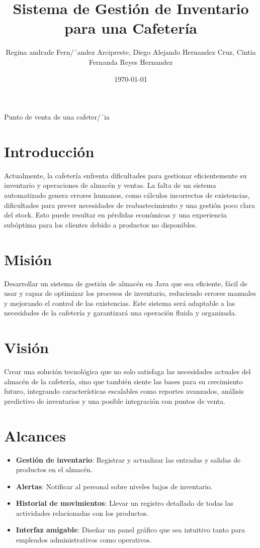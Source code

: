 \documentclass{report}
\title{Sistema de Gestión de Inventario para una Cafetería}
\author{Regina andrade Fern/´andez Arcipreste, Diego Alejando Hern\´andez Cruz, Cintia Fernanda Reyes Hern\´andez  }
\date{\today}
\begin{document}
\begin{center}

Punto de venta de una cafeter/´ia

\end{center}

\maketitle

\section{Introducción}
Actualmente, la cafetería enfrenta dificultades para gestionar eficientemente su inventario y operaciones de almacén y ventas. La falta de un sistema automatizado genera errores humanos, como cálculos incorrectos de existencias, dificultades para prever necesidades de reabastecimiento y una gestión poco clara del stock. Esto puede resultar en pérdidas económicas y una experiencia subóptima para los clientes debido a productos no disponibles.

\section{Misión}
Desarrollar un sistema de gestión de almacén en Java que sea eficiente, fácil de usar y capaz de optimizar los procesos de inventario, reduciendo errores manuales y mejorando el control de las existencias. Este sistema será adaptable a las necesidades de la cafetería y garantizará una operación fluida y organizada.

\section{Visión}
Crear una solución tecnológica que no solo satisfaga las necesidades actuales del almacén de la cafetería, sino que también siente las bases para su crecimiento futuro, integrando características escalables como reportes avanzados, análisis predictivo de inventarios y una posible integración con puntos de venta.

\section{Alcances}
\begin{itemize}
\item \textbf{Gestión de inventario}: Registrar y actualizar las entradas y salidas de productos en el almacén.
\item \textbf{Alertas}: Notificar al personal sobre niveles bajos de inventario.
\item \textbf{Historial de movimientos}: Llevar un registro detallado de todas las actividades relacionadas con los productos.
\item \textbf{Interfaz amigable}: Diseñar un panel gráfico que sea intuitivo tanto para empleados administrativos como operativos.
\end{itemize}
\end{document}
